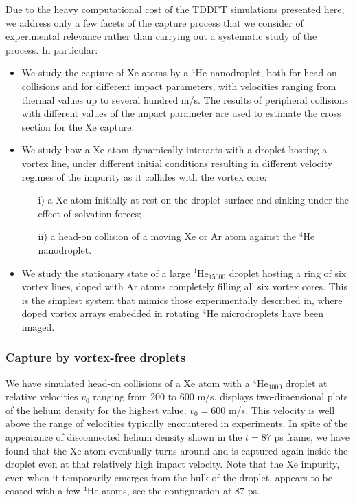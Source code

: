 		Due to the heavy computational cost of the TDDFT simulations presented here, we  address only a few facets of the capture process that we consider of experimental relevance rather than carrying out a systematic study of the process. In particular:
		\begin{itemize}
			\item We study the capture of Xe atoms by a $^4$He nanodroplet, both for head-on collisions and for different impact parameters,
with velocities ranging from thermal values up to several hundred m/s.
The results of peripheral collisions  
with different values of the impact parameter 
are used to estimate the cross section for the
Xe capture.
			\item We study how a Xe atom dynamically interacts with a 
droplet hosting a vortex line, under different initial conditions
resulting in different velocity regimes of the impurity as it 
collides with the vortex core:
			\begin{enumerate}
				\item[i)]  a Xe atom initially at rest on the droplet surface and
sinking under the effect of solvation forces;
				\item[ii)] a head-on collision of a moving Xe or Ar atom  against the
$^4$He nanodroplet.
			\end{enumerate}
			\item We study the stationary state of 
a large $^4$He$_{15000}$ 
droplet hosting a ring of six vortex lines, doped with 
Ar atoms completely filling all six vortex cores. This is the simplest system that mimics those
experimentally described in, where 
doped vortex arrays embedded in rotating $^4$He microdroplets have been imaged.
		\end{itemize}
		

	\subsubsection*{Capture by vortex-free droplets}
	We have simulated head-on collisions of a Xe atom with a
$^4$He$_{1000}$ droplet at relative velocities $v_0$ 
ranging from 200 to 600 m/s.  
displays two-dimensional plots of the helium density 
for the highest value, $v_0= 600$ m/s. This velocity is 
well above the range of velocities typically encountered
in experiments\citep{Gom11,Gom14,Jones2016}.  
In spite of the appearance of disconnected helium density shown in the 
$t= 87$ ps frame, we have found that the Xe atom eventually 
turns around and is 
captured again inside the droplet even at that relatively high impact velocity. 
Note that the Xe impurity, even when it temporarily emerges from the bulk of the 
droplet, appears to be coated with a few
$^4$He atoms, see the configuration at 87 ps.

